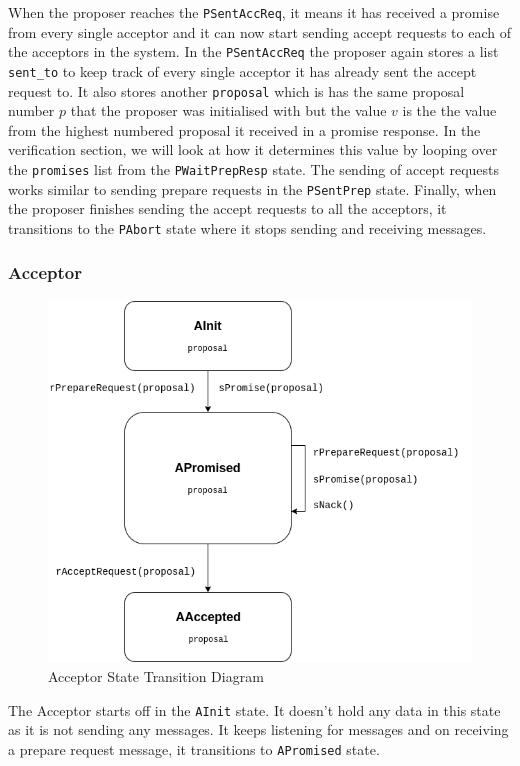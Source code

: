 When the proposer reaches the \texttt{PSentAccReq}, it means it has received a promise
from every single acceptor and it can now start sending accept requests to each
of the acceptors in the system. In the \texttt{PSentAccReq} the proposer again stores
a list \texttt{sent\_to} to keep track of every single acceptor it has already sent the
accept request to. It also stores another \texttt{proposal} which is has the same
proposal number $p$ that the proposer was initialised with but the value $v$ is the
the value from the highest numbered proposal it received in a promise response.
In the verification section, we will look at how it determines this value by looping over
the \texttt{promises} list from the \texttt{PWaitPrepResp} state. The sending of
accept requests works similar to sending prepare requests in the
\texttt{PSentPrep} state. Finally, when the proposer finishes sending the
accept requests to all the acceptors, it transitions to the \texttt{PAbort}
state where it stops sending and receiving messages.


\subsubsection{Acceptor}
\begin{figure}
\includegraphics[width=\textwidth]{figures/acceptor_state_transitions.png}
\caption{Acceptor State Transition Diagram
\label{fig:myInlineFigure}}
\end{figure}

The Acceptor starts off in the \texttt{AInit} state. It doesn't hold any data
in this state as it is not sending any messages. It keeps listening for messages
and on receiving a prepare request message, it transitions to \texttt{APromised}
state.

